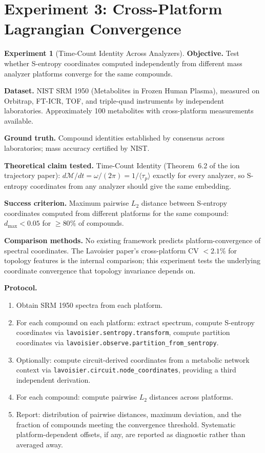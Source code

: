\documentclass[11pt,a4paper]{article}
\theoremstyle{planstyle}
\theoremstyle{definition}
\newtheorem{experiment}[theorem]{Experiment}
\theoremstyle{remark}
\newcommand{\shk}[1]{\texttt{#1}}
\begin{document}
\section{Experiment 3: Cross-Platform Lagrangian Convergence}
\label{sec:exp-lagrangian}

\begin{experiment}[Time-Count Identity Across Analyzers]
\label{exp:lagrangian}
\textbf{Objective.} Test whether S-entropy coordinates computed
independently from different mass analyzer platforms converge for the
same compounds.

\textbf{Dataset.} NIST SRM 1950 (Metabolites in Frozen Human Plasma),
measured on Orbitrap, FT-ICR, TOF, and triple-quad instruments by
independent laboratories. Approximately 100 metabolites with
cross-platform measurements available.

\textbf{Ground truth.} Compound identities established by consensus
across laboratories; mass accuracy certified by NIST.

\textbf{Theoretical claim tested.} Time-Count Identity (Theorem~6.2 of
the ion trajectory paper): $d\mathcal{M}/dt = \omega/(2\pi) = 1/\langle\tau_p\rangle$
exactly for every analyzer, so S-entropy coordinates from any analyzer
should give the same embedding.

\textbf{Success criterion.} Maximum pairwise $L_2$ distance between
S-entropy coordinates computed from different platforms for the same
compound: $d_{\max} < 0.05$ for $\geq 80\%$ of compounds.

\textbf{Comparison methods.} No existing framework predicts
platform-convergence of spectral coordinates. The Lavoisier paper's
cross-platform CV $< 2.1\%$ for topology features is the internal
comparison; this experiment tests the underlying coordinate convergence
that topology invariance depends on.

\textbf{Protocol.}
\begin{enumerate}[nosep]
\item Obtain SRM 1950 spectra from each platform.
\item For each compound on each platform: extract spectrum, compute
  S-entropy coordinates via \shk{lavoisier.sentropy.transform}, compute
  partition coordinates via \shk{lavoisier.observe.partition\_from\_sentropy}.
\item Optionally: compute circuit-derived coordinates from a metabolic
  network context via \shk{lavoisier.circuit.node\_coordinates}, providing
  a third independent derivation.
\item For each compound: compute pairwise $L_2$ distances across platforms.
\item Report: distribution of pairwise distances, maximum deviation,
  and the fraction of compounds meeting the convergence threshold.
  Systematic platform-dependent offsets, if any, are reported as
  diagnostic rather than averaged away.
\end{enumerate}
\end{experiment}
\end{document}
